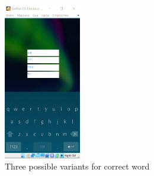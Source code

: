 \documentclass[conference]{IEEEtran}
\begin{document}
\begin{figure}[!hbt]
	\centering
	\includegraphics[width=0.3\textwidth]{images/3.png}
	\caption{
		 Three possible variants for correct word}
	\label{three}
\end{figure}
\




\begin{enumerate} 
	

\end{enumerate}
\end{document}
